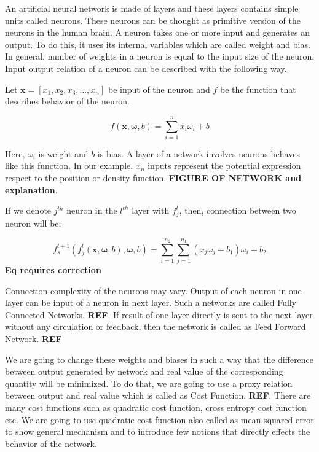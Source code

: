 \documentclass[a4paper,times,12pt]{article}
\begin{document}
An artificial neural network is made of layers and these layers contains simple units called neurons. These neurons can be thought as primitive version of the neurons in the human brain. A neuron takes one or more input and generates an output. To do this, it uses its internal variables which are called weight and bias. In general, number of weights in a neuron is equal to the input size of the neuron. Input output relation of a neuron can be described with the following way. 

Let $\boldsymbol{x} = [x_1, x_2, x_3, ..., x_n]$ be input of the neuron and $f$ be the function that describes behavior of the neuron. 

\begin{equation}
\label{eq:NU_neuron}
f(\boldsymbol{x}, \boldsymbol{\omega}, b) = \sum\limits_{i = 1}^n x_i\omega_i + b
\end{equation}

Here, $\omega_i$ is weight and $b$ is bias. A layer of a network involves neurons behaves like this function. In our example, $x_n$ inputs represent the potential expression respect to the position or density function. \textbf{FIGURE OF NETWORK and explanation}. 

If we denote $j^{th}$ neuron in the $l^{th}$ layer with $f_j^l$, then, connection between two neuron will be;

\begin{equation}
\label{eq:NU_neuron_connection}
f_s^{l+1}(f_j^{l}(\boldsymbol{x}, \boldsymbol{\omega}, b), \boldsymbol{\omega}, b) = \sum\limits_{i=1}^{n_2} \sum\limits_{j=1}^{n_1} (x_j\omega_j + b_1)\omega_i + b_2
\end{equation}
\textbf{Eq requires correction}

Connection complexity of the neurons may vary. Output of each neuron in one layer can be input of a neuron in next layer. Such a networks are called Fully Connected Networks. \textbf{REF}. If result of one layer directly is sent to the next layer without any circulation or feedback, then the network is called as Feed Forward Network. \textbf{REF}

We are going to change these weights and biases in such a way that the difference between output generated by network and real value of the corresponding quantity will be minimized. To do that, we are going to use a proxy relation between output and real value which is called as Cost Function. \textbf{REF}. There are many cost functions such as quadratic cost function, cross entropy cost function etc. We are going to use quadratic cost function also called as mean squared error to show general mechanism and to introduce few notions that directly effects the behavior of the network. 
\end{document}
